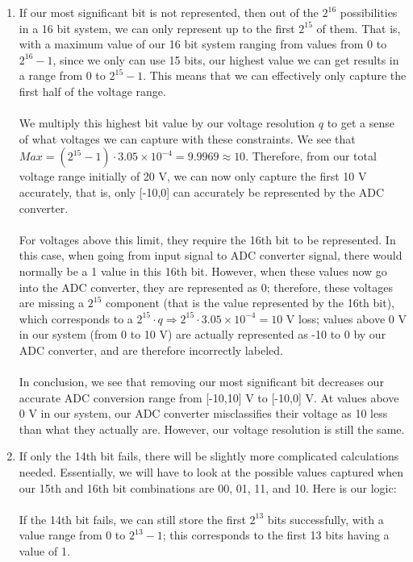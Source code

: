 \documentclass[12pt, a4paper]{article}
\begin{document}
\begin{enumerate}
\begin{enumerate}
\item
If our most significant bit is not represented, then out of the $2^{16}$ possibilities in a 16 bit system, we can only represent up to the first $2^{15}$ of them. That is, with a maximum value of our 16 bit system ranging from values from 0 to $2^{16} - 1$, since we only can use 15 bits, our highest value we can get results in a range from 0 to $2^{15} -1$.  This means that we can effectively only capture the first half of the voltage range.\\ \\
We multiply this highest bit value by our voltage resolution $q$ to get a sense of what voltages we can capture with these constraints. We see that $Max = (2^{15} - 1) \cdot 3.05 \times 10^{-4} = 9.9969 \approx 10$. Therefore, from our total voltage range initially of 20 V, we can now only capture the first 10 V accurately, that is, only [-10,0] can accurately be represented by the ADC converter. \\ \\
For voltages above this limit, they require the 16th bit to be represented. In this case, when going from input signal to ADC converter signal, there would normally be a 1 value in this 16th bit. However, when these values now go into the ADC converter, they are represented as 0; therefore, these voltages are missing a $2^{15}$ component (that is the value represented by the 16th bit), which corresponds to a $2^{15} \cdot q \Rightarrow 2^{15} \cdot 3.05 \times 10^{-4} = 10$ V loss; values above 0 V in our system (from 0 to 10 V) are actually represented as -10 to 0 by our ADC converter, and are therefore incorrectly labeled. \\ \\
In conclusion, we see that removing our most significant bit decreases our accurate ADC conversion range from [-10,10] V to [-10,0] V. At values above 0 V in our system, our ADC converter misclassifies their voltage as 10 less than what they actually are. However, our voltage resolution is still the same.
\item 
If only the 14th bit fails, there will be slightly more complicated calculations needed. Essentially, we will have to look at the possible values captured when our 15th and 16th bit combinations are 00, 01, 11, and 10. Here is our logic: \\ \\
If the 14th bit fails, we can still store the first $2^{13}$ bits successfully, with a value range from 0 to $2^{13} - 1$; this corresponds to the first 13 bits having a value of 1. \\ \\ 

\end{enumerate}
\end{enumerate}
\end{document}
